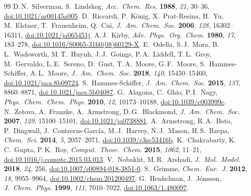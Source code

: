 \documentclass[11pt,a4paper]{article}
\begin{document}
\begin{thebibliography}{99}
 D.\,N.\ Silverman, S.\ Lindskog, \textit{Acc.\ Chem.\ Res.} \textbf{1988}, \textit{21}, 30--36, \href{https://doi.org/10.1021/ar00145a005}{doi:10.1021/ar00145a005}.
 D.\ Riccardi, P.\ K\"onig, X.\ Prat-Resina, H.\ Yu, M.\ Elstner, T.\ Frauenheim, Q.\ Cui, \textit{J.\ Am.\ Chem.\ Soc.} \textbf{2006}, \textit{128}, 16302--16311, \href{https://doi.org/10.1021/ja065451j}{doi:10.1021/ja065451j}.
 A.\,J.\ Kirby, \textit{Adv.\ Phys.\ Org.\ Chem.} \textbf{1980}, \textit{17}, 183--278, \href{https://doi.org/10.1016/S0065-3160(08)60129-X}{doi:10.1016/S0065-3160(08)60129-X}.
 E.\ Odella, S.\,J.\ Mora, B.\,L.\ Wadsworth, M.\,T.\ Huynh, J.\,J.\ Goings, P.\,A.\ Liddell, T.\,L.\ Groy, M.\ Gervaldo, L.\,E.\ Sereno, D.\ Gust, T.\,A.\ Moore, G.\,F.\ Moore, S.\ Hammes-Schiffer, A.\,L.\ Moore, \textit{J.\ Am.\ Chem.\ Soc.} \textbf{2018}, \textit{140}, 15450--15460, \href{https://doi.org/10.1021/jacs.8b09724}{doi:10.1021/jacs.8b09724}.
 S.\ Hammes-Schiffer, \textit{J.\ Am.\ Chem.\ Soc.} \textbf{2015}, \textit{137}, 8860--8871, \href{https://doi.org/10.1021/jacs.5b04087}{doi:10.1021/jacs.5b04087}.
 G.\ Alagona, C.\ Ghio, P.\,I.\ Nagy, \textit{Phys.\ Chem.\ Chem.\ Phys.} \textbf{2010}, \textit{12}, 10173--10188, \href{https://doi.org/10.1039/c003999c}{doi:10.1039/c003999c}.
 N.\ Zotova, A.\ Franzke, A.\ Armstrong, D.\,G.\ Blackmond, \textit{J.\ Am.\ Chem.\ Soc.} \textbf{2007}, \textit{129}, 15100--15101, \href{https://doi.org/10.1021/ja0738881}{doi:10.1021/ja0738881}.
 A.\ Armstrong, R.\,A.\ Boto, P.\ Dingwall, J.\ Contreras-Garc\'ia, M.\,J.\ Harvey, N.\,J.\ Mason, H.\,S.\ Rzepa, \textit{Chem.\ Sci.} \textbf{2014}, \textit{5}, 2057--2071, \href{https://doi.org/10.1039/c3sc53416b}{doi:10.1039/c3sc53416b}.
 K.\ Chakrabarty, K.\,C.\ Gupta, P.\,K.\ Roy, \textit{Comput.\ Theor.\ Chem.} \textbf{2015}, \textit{1062}, 11--21, \href{https://doi.org/10.1016/j.comptc.2015.03.013}{doi:10.1016/j.comptc.2015.03.013}.
 V.\ Nobakht, M.\,R.\ Arshadi, \textit{J.\ Mol.\ Model.} \textbf{2018}, \textit{24}, 256, \href{https://doi.org/10.1007/s00894-018-3851-0}{doi:10.1007/s00894-018-3851-0}.
 S.\ Grimme, \textit{Chem.\ Eur.\ J.} \textbf{2012}, \textit{18}, 9955--9964, \href{https://doi.org/10.1002/chem.201200497}{doi:10.1002/chem.201200497}.
 G.\ Henkelman, J.\ J\'onsson, \textit{J.\ Chem.\ Phys.} \textbf{1999}, \textit{111}, 7010--7022, \href{https://doi.org/10.1063/1.480097}{doi:10.1063/1.480097}.

\end{thebibliography}
\end{document}
